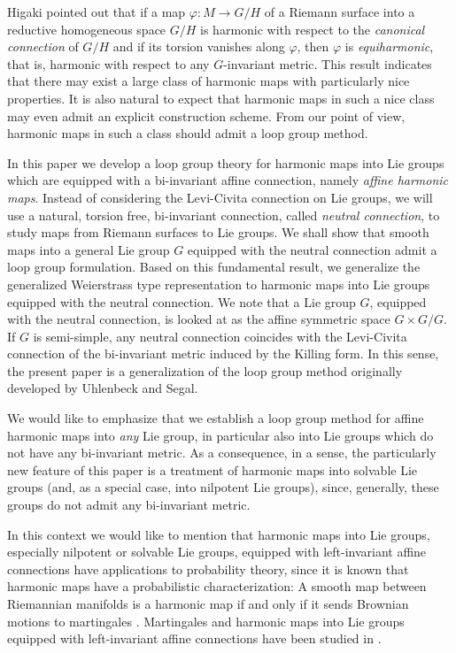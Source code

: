 \documentclass[12pt]{amsart}
\theoremstyle{definition}
\theoremstyle{remark}
\numberwithin{equation}{section}
\begin{document}
 Higaki \cite{Higaki} pointed out that if 
 a map $\varphi:M\to G/H$ of a Riemann surface into a 
 reductive homogeneous space $G/H$ 
 is harmonic with respect to the \textit{canonical connection} of $G/H$
 and if its torsion vanishes along $\varphi$, then
 $\varphi$ is \textit{equiharmonic}, that is, harmonic with
 respect to any $G$-invariant metric.
 This result indicates that there may exist
 a large class of harmonic maps with particularly nice properties.
 It is also natural to expect that harmonic maps in such a nice class
 may even admit an explicit construction scheme.
 From our point of view,
 harmonic maps in such a class should admit a loop group method.

 In this paper we develop a loop group theory for harmonic maps into 
 Lie groups which are equipped with a bi-invariant affine connection, 
 namely \textit{affine harmonic maps}.
 Instead of considering the Levi-Civita connection on Lie groups, 
 we will use a natural, torsion free, bi-invariant connection, called
 \textit{neutral connection},  to study maps from
 Riemann surfaces to Lie groups.
 We shall show that smooth maps into a general Lie group $G$ 
 equipped with the neutral connection admit a loop group formulation.
 Based on this fundamental result, we generalize the generalized 
 Weierstrass type representation to
 harmonic maps into Lie groups equipped with the neutral connection.
 We note that a Lie group $G$, equipped with the neutral connection, 
 is looked at as the affine symmetric space $G\times{G}/G$.
 If $G$ is semi-simple, any neutral connection
 coincides with the Levi-Civita connection of the
 bi-invariant metric induced by the Killing form.
 In this sense, the present paper is a generalization
 of the loop group method originally developed by Uhlenbeck and Segal.

 We would like to emphasize that we establish a
 loop group method for affine harmonic maps into
 \textit{any} Lie group, in particular also into
 Lie groups which do
 not have any bi-invariant metric.
 As a consequence, in a sense,  the particularly new feature
 of this paper is a treatment of harmonic maps into solvable Lie groups
 (and, as a special case, into  nilpotent Lie groups), since, generally, these groups  do not admit
 any bi-invariant metric.

 In this context we would like to mention that 
 harmonic maps into Lie groups, especially nilpotent or solvable 
 Lie groups, equipped with left-invariant affine 
 connections have applications to probability theory, since it is known 
 that harmonic maps have a probabilistic characterization:
 A smooth map between Riemannian manifolds is a harmonic map if and only if 
 it sends Brownian motions to martingales \cite{Kendall, Meyer}.  
 Martingales and harmonic maps into Lie groups equipped 
 with left-invariant affine connections have been studied in \cite{Arnaudon,Stelmastchuk}.
\end{document}
